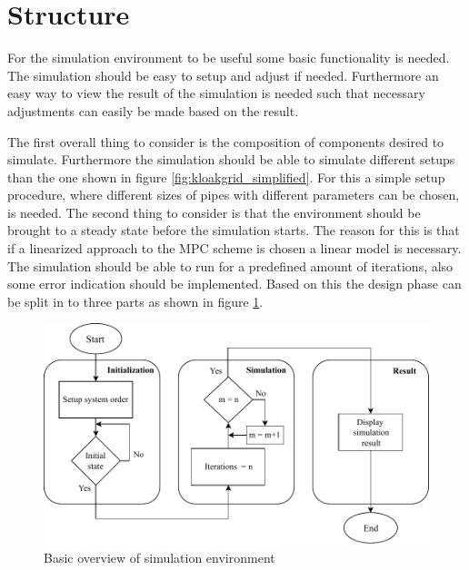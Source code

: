 \section{Structure}\label{sec:Structure}
For the simulation environment to be useful some basic functionality is needed. The simulation should be easy to setup and adjust if needed. 
Furthermore an easy way to view the result of the simulation is needed such that necessary adjustments can easily be made based on the result.

The first overall thing to consider is the composition of components desired to simulate. Furthermore the simulation should be able to simulate different setups than the one shown in figure \ref{fig:kloakgrid_simplified}. For this a simple setup procedure, where different sizes of pipes with different parameters can be chosen, is needed. 
The second thing to consider is that the environment should be brought to a steady state before the simulation starts. The reason for this is that if a linearized approach to the MPC scheme is chosen a linear model is necessary. The simulation should be able to run for a predefined amount of iterations, also some error indication should be implemented.
Based on this the design phase can be split in to three parts as shown in figure \ref{fig:struct_overview}.

\begin{figure}[H]
\centering
\includegraphics[width=1 \textwidth]{report/simulation/pictures/struct_overview.pdf}
\caption{Basic overview of simulation environment}
\label{fig:struct_overview}
\end{figure}



